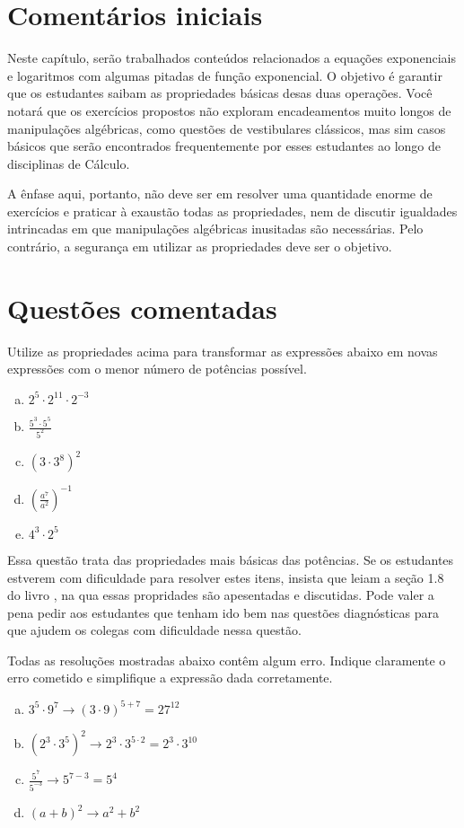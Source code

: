 \documentclass[main_estudante.tex]{subfiles}
\begin{document}
\section{Comentários iniciais}

Neste capítulo, serão trabalhados conteúdos relacionados a equações exponenciais e logaritmos com algumas pitadas de função exponencial. O objetivo é garantir que os estudantes saibam as propriedades básicas desas duas operações. Você notará que os exercícios propostos não exploram encadeamentos muito longos de manipulações algébricas, como questões de vestibulares clássicos, mas sim casos básicos que serão encontrados frequentemente por esses estudantes ao longo de disciplinas de Cálculo.

A ênfase aqui, portanto, não deve ser em resolver uma quantidade enorme de exercícios e praticar à exaustão todas as propriedades, nem de discutir igualdades intrincadas em que manipulações algébricas inusitadas são necessárias. Pelo contrário, a segurança em utilizar as propriedades deve ser o objetivo.

\section{Questões comentadas}

\begin{questao}
Utilize as propriedades acima para transformar as expressões abaixo em novas expressões com o menor número de potências possível.
\begin{enumerate}[a)]
\item $2^5 \cdot 2^{11} \cdot 2^{-3}$
\item $\frac{5^3 \cdot 5^5}{5^2}$
\item $(3 \cdot 3^8)^2$
\item $(\frac{a^7}{a^2})^{-1}$
\item $4^3 \cdot 2^5$
\end{enumerate}
\end{questao}

Essa questão trata das propriedades mais básicas das potências. Se os estudantes estverem com dificuldade para resolver estes itens, insista que leiam a seção 1.8 do livro , na qua essas propridades são apesentadas e discutidas. Pode valer a pena pedir aos estudantes que tenham ido bem nas questões diagnósticas para que ajudem os colegas com dificuldade nessa questão.

\begin{questao}
Todas as resoluções mostradas abaixo contêm algum erro. Indique claramente o erro cometido e simplifique a expressão dada corretamente.
\begin{enumerate}[a)]
\item $3^5 \cdot 9^7  \longrightarrow (3 \cdot 9)^{5+7} = 27^{12}$
\item $(2^3 \cdot 3^5)^2  \longrightarrow 2^3 \cdot 3^{5 \cdot 2} = 2^3 \cdot 3^{10}$
\item $\frac{5^7}{5^{-3}}  \longrightarrow 5^{7-3}=5^4$
\item $(a+b)^2 \longrightarrow a^2+b^2$
\end{enumerate}
\end{questao}
\end{document}
